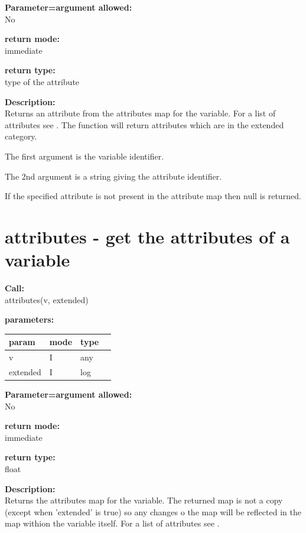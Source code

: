         {\bf Parameter=argument allowed:} \\
        No
        
        {\bf return mode:} \\
        immediate

        {\bf return type:} \\
        type of the attribute
        
        {\bf Description:} \\
        Returns an attribute from the attributes map for the variable. For a
        list of attributes see . The function will
        return attributes which are in the extended category.
        
        The first argument is the variable identifier.
        
        The 2nd argument is a string giving the attribute identifier.
        
        If the specified attribute is not present in the attribute map then
        null is returned.


    \section{attributes - get the attributes of a variable}\label{sec:ifattributes}
        
        
        {\bf Call:} \\
        attributes(v, extended)
        
        {\bf parameters:} \\
        \begin{tabular}{| l | l | l | l |}
        \hline
        param  & mode & type & \\
        \hline \hline
        v        & I & any & \\ \hline
        extended & I & log & \\ \hline
        \end{tabular}
        
        {\bf Parameter=argument allowed:} \\
        No
        
        {\bf return mode:} \\
        immediate

        {\bf return type:} \\
        float
        
        {\bf Description:} \\
        Returns the attributes map for the variable. The returned map is not a
        copy (except when 'extended' is true) so any changes o the map will be
        reflected in the map withion the variable itself.
        For a list of attributes see .
        
